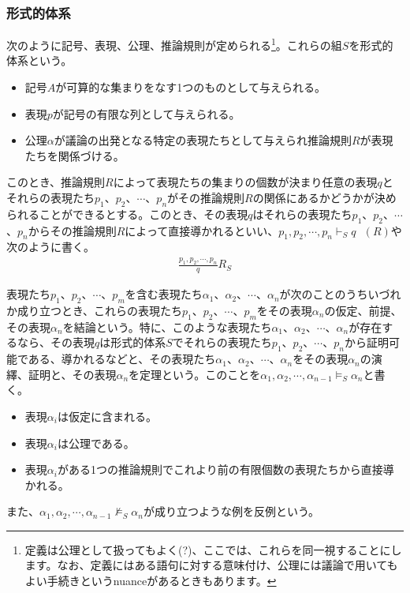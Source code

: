 \documentclass[a4paper]{jsarticle}
\begin{document}
\subsubsection{形式的体系}%
\begin{dfn}
次のように記号、表現、公理、推論規則が定められる\footnote{定義は公理として扱ってもよく(?)、ここでは、これらを同一視することにします。なお、定義にはある語句に対する意味付け、公理には議論で用いてもよい手続きというnuanceがあるときもあります。}。これらの組$S$を形式的体系という。
\begin{itemize}
\item
  記号$A$が可算的な集まりをなす1つのものとして与えられる。
\item
  表現$p$が記号の有限な列として与えられる。
\item
  公理$\alpha$が議論の出発となる特定の表現たちとして与えられ推論規則$R$が表現たちを関係づける。
\end{itemize}
このとき、推論規則$R$によって表現たちの集まりの個数が決まり任意の表現$q$とそれらの表現たち$p_{1}$、$p_{2}$、$\cdots$、$p_{n}$がその推論規則$R$の関係にあるかどうかが決められることができるとする。このとき、その表現$q$はそれらの表現たち$p_{1}$、$p_{2}$、$\cdots$、$p_{n}$からその推論規則$R$によって直接導かれるといい、$p_{1},p_{2},\cdots,p_{n} \vdash_{S}q\ \ \ (R)$や次のように書く。
\begin{align*}
\frac{p_{1},p_{2},\cdots,p_{n}}{q}R_{S}
\end{align*}
\end{dfn}
\begin{dfn}
表現たち$p_{1}$、$p_{2}$、$\cdots$、$p_{m}$を含む表現たち$\alpha_{1}$、$\alpha_{2}$、$\cdots$、$\alpha_{n}$が次のことのうちいづれか成り立つとき、これらの表現たち$p_{1}$、$p_{2}$、$\cdots$、$p_{m}$をその表現$\alpha_{n}$の仮定、前提、その表現$\alpha_{n}$を結論という。特に、このような表現たち$\alpha_{1}$、$\alpha_{2}$、$\cdots$、$\alpha_{n}$が存在するなら、その表現$q$は形式的体系$S$でそれらの表現たち$p_{1}$、$p_{2}$、$\cdots$、$p_{n}$から証明可能である、導かれるなどと、その表現たち$\alpha_{1}$、$\alpha_{2}$、$\cdots$、$\alpha_{n}$をその表現$\alpha_{n}$の演繹、証明と、その表現$\alpha_{n}$を定理という。このことを$\alpha_{1},\alpha_{2},\cdots,\alpha_{n - 1} \vDash_{S}\alpha_{n}$と書く。
\begin{itemize}
\item
  表現$\alpha_{i}$は仮定に含まれる。
\item
  表現$\alpha_{i}$は公理である。
\item
  表現$\alpha_{i}$がある1つの推論規則でこれより前の有限個数の表現たちから直接導かれる。
\end{itemize}
また、$\alpha_{1},\alpha_{2},\cdots,\alpha_{n - 1} \nvDash_{S}\alpha_{n}$が成り立つような例を反例という。
\end{dfn}
\end{document}
